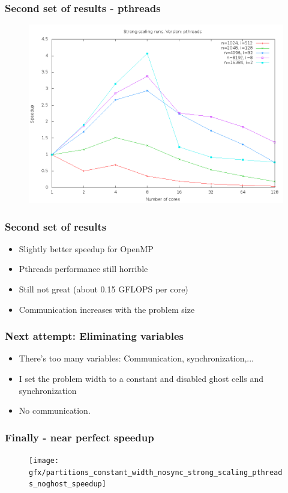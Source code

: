 \documentclass{beamer}
\begin{document}
\begin{frame}
\frametitle{Second set of results - pthreads}
\begin{figure}
\includegraphics[width=\textwidth]{gfx/partitions_strong_scaling_pthreads_speedup}
\end{figure}
\end{frame}

\begin{frame}
\frametitle{Second set of results}
\begin{itemize}
\item Slightly better speedup for OpenMP
\pause
\item Pthreads performance still horrible
\pause
\item Still not great (about 0.15 GFLOPS per core)
\item Communication increases with the problem size 
\end{itemize}
\end{frame}

\begin{frame}
\frametitle{Next attempt: Eliminating variables}
\begin{itemize}
\item There's too many variables: Communication, synchronization,...
\pause
\item I set the problem width to a constant and disabled ghost cells and synchronization
\item No communication.
\end{itemize}
\end{frame}

\begin{frame}
\frametitle{Finally - near perfect speedup}
\begin{figure}
\texttt{[image: gfx/partitions\_constant\_width\_nosync\_strong\_scaling\_pthreads\_noghost\_speedup]}
\end{figure}
\end{frame}
\end{document}
